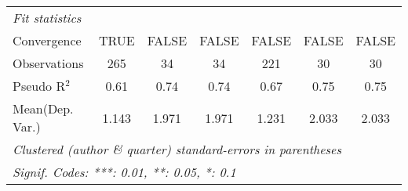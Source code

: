 \begin{tabular}{lcccccc}
   \emph{Fit statistics}\\
   Convergence             &TRUE         & FALSE         & FALSE       & FALSE  & FALSE         & FALSE\\  
   Observations            & 265         & 34            & 34          & 221    & 30            & 30\\  
   Pseudo R$^2$            & 0.61        & 0.74          & 0.74        & 0.67   & 0.75          & 0.75\\  
Mean(Dep. Var.) & 1.143 & 1.971 & 1.971 & 1.231 & 2.033 & 2.033 \\
   \midrule \midrule
   \multicolumn{7}{l}{\emph{Clustered (author \& quarter) standard-errors in parentheses}}\\
   \multicolumn{7}{l}{\emph{Signif. Codes: ***: 0.01, **: 0.05, *: 0.1}}\\
\end{tabular}
\par\endgroup

